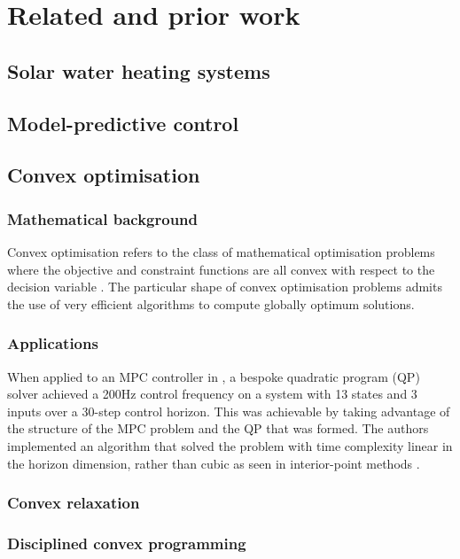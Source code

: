 \chapter{Related and prior work}

\section{Solar water heating systems}

\section{Model-predictive control}

\section{Convex optimisation}

\subsection{Mathematical background}

Convex optimisation refers to the class of mathematical optimisation problems
where the objective and constraint functions are all convex with respect to the
decision variable \cite{Boyd04}. The particular shape of convex optimisation
problems admits the use of very efficient algorithms to compute globally
optimum solutions.

\subsection{Applications}

When applied to an MPC controller in \cite{Wang10}, a bespoke quadratic program
(QP) solver achieved a 200Hz control frequency on a system with 13 states and 3
inputs over a 30-step control horizon. This was achievable by taking advantage
of the structure of the MPC problem and the QP that was formed. The authors
implemented an algorithm that solved the problem with time complexity linear in
the horizon dimension, rather than cubic as seen in interior-point methods
\cite{}.

\subsection{Convex relaxation}

\subsection{Disciplined convex programming}

